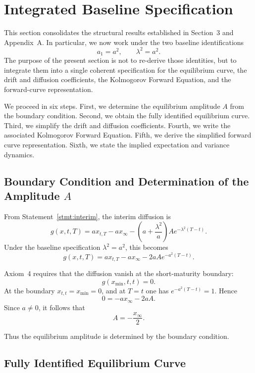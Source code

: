\documentclass[12pt]{article}
\theoremstyle{statementstyle}
\begin{document}
\section{Integrated Baseline Specification}
\label{sec:structural-integration}

This section consolidates the structural results established in
Section~3 and Appendix~A. In particular, we now work under the two
baseline identifications
\[
a_{1}=a^{2},
\qquad
\lambda^{2}=a^{2}.
\]
The purpose of the present section is not to re-derive those identities,
but to integrate them into a single coherent specification for the
equilibrium curve, the drift and diffusion coefficients, the Kolmogorov
Forward Equation, and the forward-curve representation.

We proceed in six steps. First, we determine the equilibrium amplitude
\(A\) from the boundary condition. Second, we obtain the fully identified
equilibrium curve. Third, we simplify the drift and diffusion
coefficients. Fourth, we write the associated Kolmogorov Forward
Equation. Fifth, we derive the simplified forward curve representation. Sixth, we state the implied expectation and variance dynamics.

\subsection{Boundary Condition and Determination of the Amplitude \(A\)}
\label{subsec:determine-A}

From Statement~\ref{stmt:interim}, the interim diffusion is
\[
g(x,t,T)
=
a x_{t,T}
-
a x_{\infty}
-
\left(a+\frac{\lambda^{2}}{a}\right)
A e^{-\lambda^{2}(T-t)}.
\]
Under the baseline specification \(\lambda^{2}=a^{2}\), this becomes
\[
g(x,t,T)
=
a x_{t,T}
-
a x_{\infty}
-
2aA e^{-a^{2}(T-t)}.
\]

Axiom~4 requires that the diffusion vanish at the short-maturity
boundary:
\[
g(x_{\min},t,t)=0.
\]
At the boundary \(x_{t,t}=x_{\min}=0\), and at \(T=t\) one has
\(e^{-a^{2}(T-t)}=1\). Hence
\[
0
=
-a x_{\infty}
-
2aA.
\]
Since \(a\neq 0\), it follows that
\begin{equation}
A=-\frac{x_{\infty}}{2}.
\tag{5.1.1}\label{eq:A-half-xinf}
\end{equation}

Thus the equilibrium amplitude is determined by the boundary
condition.

\subsection{Fully Identified Equilibrium Curve}
\label{subsec:reevaluate-xe}
\end{document}

